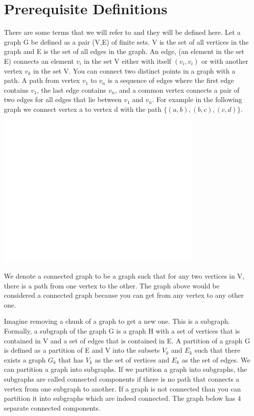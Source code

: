 

\section{Prerequisite Definitions}  
There are some terms that we will refer to and they will be defined here. Let a graph G be defined as a pair (V,E) of finite sets. V is the set of all vertices in the graph and E is the set of all edges in the graph. An edge, (an element in the set E) connects an element $v_i$ in the set V either with itself $(v_i,v_i)$ or with another vertex $v_k$ in the set V. 
	You can connect two distinct points in a graph with a path.  A path from vertex $v_1$ to $v_n$ is a sequence of edges where the first edge contains $v_1$, the last edge contains $v_n$, and a common vertex connects a pair of two edges for all edges that lie between $v_1$ and $v_n$. For example in the following graph we connect vertex a to vertex d with the path $\{(a,b), (b,c),(c,d)\}$. 


\includegraphics[height = 3in]{white.png}

We denote a connected graph to be a graph such that for any two vertices in V, there is a path from one vertex to the other. The graph above would be considered a connected graph because you can get from any vertex to any other one. 

Imagine removing a chunk of a graph to get a new one. This is a subgraph. Formally, a subgraph of the graph G is a graph H with a set of vertices that is contained in V and a set of edges that is contained in E.  A partition of a graph G is defined as a partition of E and V into the subsets $V_k$ and $E_k$ such that there exists a graph $G_k$ that has $V_k$ as the set of vertices and $E_k$ as the set of edges. We can partition a graph into subgraphs. If we partition a graph into subgraphs, the subgraphs are called connected components if there is no path that connects a vertex from one subgraph to another. If a graph is not connected than you can partition it into subgraphs which are indeed connected. The graph below has 4 separate connected components.
	
